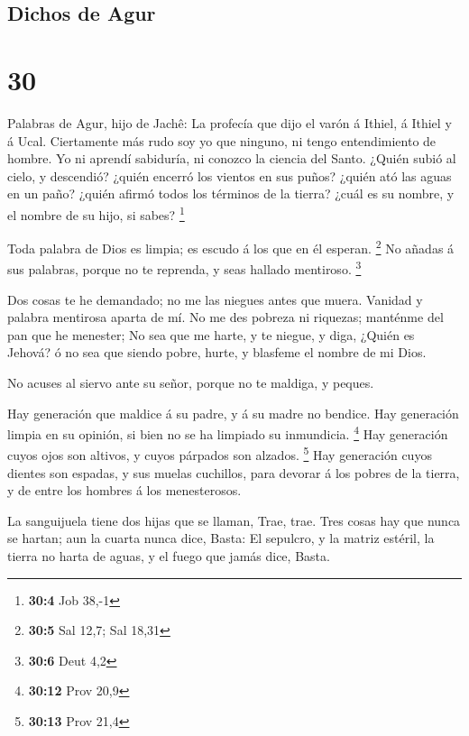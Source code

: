\hypertarget{dichos-de-agur}{%
\subsection{Dichos de Agur}\label{dichos-de-agur}}

\hypertarget{section-29}{%
\section{30}\label{section-29}}

 Palabras de Agur, hijo de Jachê: La profecía que dijo el
varón á Ithiel, á Ithiel y á Ucal.  Ciertamente más rudo soy
yo que ninguno, ni tengo entendimiento de hombre.  Yo ni
aprendí sabiduría, ni conozco la ciencia del Santo.  ¿Quién
subió al cielo, y descendió? ¿quién encerró los vientos en sus puños?
¿quién ató las aguas en un paño? ¿quién afirmó todos los términos de la
tierra? ¿cuál es su nombre, y el nombre de su hijo, si sabes?
\footnote{\textbf{30:4} Job 38,-1}

 Toda palabra de Dios es limpia; es escudo á los que en él
esperan. \footnote{\textbf{30:5} Sal 12,7; Sal 18,31}  No
añadas á sus palabras, porque no te reprenda, y seas hallado mentiroso.
\footnote{\textbf{30:6} Deut 4,2}

 Dos cosas te he demandado; no me las niegues antes que
muera.  Vanidad y palabra mentirosa aparta de mí. No me des
pobreza ni riquezas; manténme del pan que he menester;  No
sea que me harte, y te niegue, y diga, ¿Quién es Jehová? ó no sea que
siendo pobre, hurte, y blasfeme el nombre de mi Dios.

 No acuses al siervo ante su señor, porque no te maldiga, y
peques.

 Hay generación que maldice á su padre, y á su madre no
bendice.  Hay generación limpia en su opinión, si bien no
se ha limpiado su inmundicia. \footnote{\textbf{30:12} Prov 20,9}
 Hay generación cuyos ojos son altivos, y cuyos párpados
son alzados. \footnote{\textbf{30:13} Prov 21,4}  Hay
generación cuyos dientes son espadas, y sus muelas cuchillos, para
devorar á los pobres de la tierra, y de entre los hombres á los
menesterosos.

 La sanguijuela tiene dos hijas que se llaman, Trae, trae.
Tres cosas hay que nunca se hartan; aun la cuarta nunca dice, Basta:
 El sepulcro, y la matriz estéril, la tierra no harta de
aguas, y el fuego que jamás dice, Basta.

